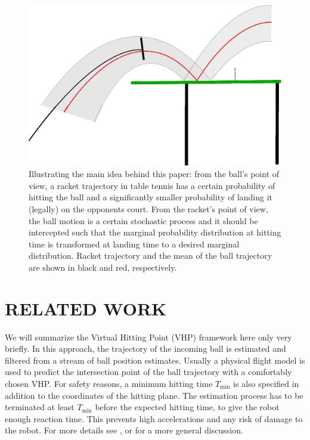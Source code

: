 \documentclass[letterpaper, 10 pt, conference]{ieeeconf}
\begin{document}
\begin{figure}[t!]
\centering
\includegraphics[scale=0.4]{drawing.eps}			
\caption{Illustrating the main idea behind this paper: from the ball's point of view, a racket trajectory in table tennis has a certain probability of hitting the ball and a significantly smaller probability of landing it (legally) on the opponents court. From the racket's point of view, the ball motion is a certain stochastic process and it should be intercepted such that the marginal probability distribution at hitting time is transformed at landing time to a desired marginal distribution. Racket trajectory and the mean of the ball trajectory are shown in black and red, respectively. }
\label{mainIdea}
\end{figure}

\section{RELATED WORK}\label{relatedWork}

We will summarize the Virtual Hitting Point (VHP) framework here only very briefly. In this approach, the trajectory of the incoming ball is estimated and filtered from a stream of ball position estimates. Usually a physical flight model is used to predict the intersection point of the ball trajectory with a comfortably chosen VHP. For safety reasons, a minimum hitting time $T_{\textrm{min}}$ is also specified in addition to the coordinates of the hitting plane. The estimation process has to be terminated at least $T_{\textrm{min}}$ before the expected hitting time, to give the robot enough reaction time. This prevents high accelerations and any risk of damage to the robot. For more details see \cite{Muelling13}, or \cite{Matsushima05} for a more general discussion. 
\end{document}

